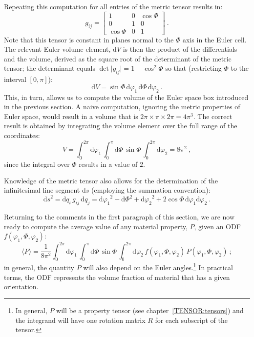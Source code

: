 Repeating this computation for all entries of the metric tensor results in:
\begin{equation}
	g_{ij} = \begin{bmatrix}1&0&\cos\Phi\\0&1&0\\ \cos\Phi& 0& 1\end{bmatrix}\ .
\end{equation}
Note that this tensor is constant in planes normal to the $\Phi$ axis in the Euler cell.  The relevant Euler volume element, $\mathrm{d}V$ is then the product of the differentials and the volume, derived as the square root of the determinant of the metric tensor; the determinant equals $\det\vert g_{ij}\vert = 1-\cos^2\Phi$ so that (restricting $\Phi$ to the interval $[0,\pi]$):
\begin{equation}
	\mathrm{d}V = \sin\Phi\,\mathrm{d}\varphi_1\,\mathrm{d}\Phi\,\mathrm{d}\varphi_2\ .\label{\chabbr:eq:EulerdV}
\end{equation}
This, in turn, allows us to compute the volume of the Euler space box introduced in the previous section.  A naive computation, ignoring the metric properties of Euler space, would result in a volume that is $2\pi\times \pi\times 2\pi=4\pi^3$.  The correct result is obtained by integrating the volume element over the full range of the coordinates:
\begin{equation}
	V = \int_0^{2\pi}\!\!\!\mathrm{d}\varphi_1\,\int_0^{\pi}\!\!\!\mathrm{d}\Phi\,\sin\Phi\,\int_0^{2\pi}\!\!\!\mathrm{d}\varphi_2 = 8\pi^2\ ,\label{\chabbr:eq:EulerVolume}
\end{equation}
since the integral over $\Phi$ results in a value of $2$.  

Knowledge of the metric tensor also allows for the determination of the infinitesimal line segment $\mathrm{d}s$ (employing the summation convention):
\begin{equation}
	{\mathrm{d}s}^2 = \mathrm{d}q_i\,g_{ij}\,\mathrm{d}q_j = {\mathrm{d}\varphi_1}^2+{\mathrm{d}\Phi}^2+{\mathrm{d}\varphi_2}^2+2\cos\Phi\,\mathrm{d}\varphi_1\mathrm{d}\varphi_2\ .\label{\chabbr:eq:Eulerds}
\end{equation}


Returning to the comments in the first paragraph of this section, we are now ready to compute the average value of any material property, $P$, given an ODF $f(\varphi_1,\Phi,\varphi_2)$:
\begin{equation}
	\langle P\rangle = \frac{1}{8\pi^2} \int_0^{2\pi}\!\!\!\mathrm{d}\varphi_1\,\int_0^{\pi}\!\!\!\mathrm{d}\Phi\,\sin\Phi\,\int_0^{2\pi}\!\!\!\mathrm{d}\varphi_2\, f(\varphi_1,\Phi,\varphi_2)\, P(\varphi_1,\Phi,\varphi_2)\ ;
\end{equation}
in general, the quantity $P$ will also depend on the Euler angles.\footnote{In general, $P$ will be a property tensor (see chapter~\ref{TENSOR:tensors}) and the integrand will have one rotation matrix $R$ for each subscript of the tensor.}  In practical terms, the ODF represents the volume fraction of material that has a given orientation. 



